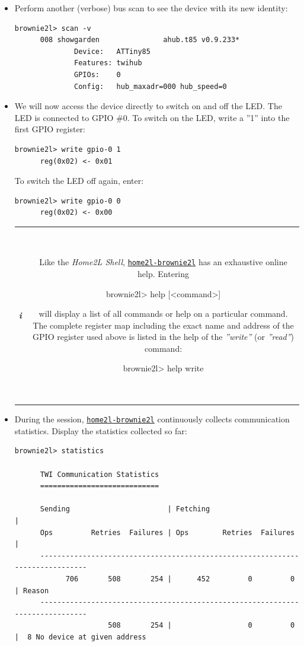 \documentclass[12pt,english,parskip=half,headheight=19pt]{scrreprt}
\newcommand{\lstbox}[1]{
  \par
  \colorbox{lstbackground}{\ttfamily\footnotesize{\parbox{\linewidth}{#1}}}
  \par
}
\newcommand{\infobox}[1]{
  \par
  \medskip
  \hfill
  \setlength\arrayrulewidth{1pt}
  \begin{tabular}[t]{c|c|}
    \parbox{1.8em}{\hfill\textit{\Huge\textbf{i}\,}}
    &
    \,\parbox{0.89\linewidth}{\setlength{\parskip}{0.5em} \small #1}\,
  \end{tabular}
  \medskip
  \par
}
\newcommand{\idx}[1]{#1\index{#1}}
\newcommand{\reftool}[1]{\hyperref[tool:#1]{\texttt{\idx{#1}}}}
\begin{document}
\begin{itemize}[$\blacktriangleright$]
  \item
    Perform another (verbose) bus scan to see the device with its new identity:
    \begin{lstlisting}[language=brownie2l]
      brownie2l> scan -v
      008 showgarden               ahub.t85 v0.9.233*
              Device:   ATTiny85
              Features: twihub
              GPIOs:    0
              Config:   hub_maxadr=000 hub_speed=0
    \end{lstlisting}

  \item
    We will now access the device directly to switch on and off the LED. The LED is connected to GPIO \#0.
    To switch on the LED, write a ''1'' into the first GPIO register:
    \begin{lstlisting}[language=brownie2l]
      brownie2l> write gpio-0 1
      reg(0x02) <- 0x01
    \end{lstlisting}
    To switch the LED off again, enter:
    \begin{lstlisting}[language=brownie2l]
      brownie2l> write gpio-0 0
      reg(0x02) <- 0x00
    \end{lstlisting}

    \infobox{
      Like the \textit{Home2L Shell}, \reftool{home2l-brownie2l} has an exhaustive online help.
      Entering
      \lstbox{brownie2l> help [<command>]}
      will display a list of all commands or help on a particular command.
      The complete register map including the exact name and address of the GPIO register used above
      is listed in the help of the \textit{''write''} (or \textit{''read''}) command:
      \lstbox{brownie2l> help write}
    }

  \item
    During the session, \reftool{home2l-brownie2l} continuously collects communication statistics.
    Display the statistics collected so far:
    \begin{lstlisting}[language=brownie2l]
      brownie2l> statistics

      TWI Communication Statistics
      ============================

      Sending                       | Fetching                     |
      Ops         Retries  Failures | Ops        Retries  Failures |
      ------------------------------------------------------------------------------
            706       508       254 |      452         0         0 | Reason
      ------------------------------------------------------------------------------
                      508       254 |                  0         0 |  8 No device at given address


\end{lstlisting}
\end{itemize}
\end{document}

